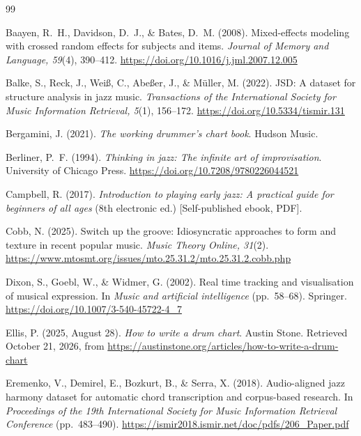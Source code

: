 \documentclass[10pt,twocolumn,a4paper]{article}
\begin{document}
\scriptsize
\begin{thebibliography}{99}
\setlength{\itemsep}{0.3ex}

Baayen, R.~H., Davidson, D.~J., \& Bates, D.~M. (2008). Mixed-effects modeling with
crossed random effects for subjects and items. \emph{Journal of Memory and Language,
59}(4), 390--412. \url{https://doi.org/10.1016/j.jml.2007.12.005}

Balke, S., Reck, J., Wei\ss, C., Abe\ss er, J., \& M\"uller, M. (2022). JSD: A
dataset for structure analysis in jazz music. \emph{Transactions of the International
Society for Music Information Retrieval, 5}(1), 156--172.
\url{https://doi.org/10.5334/tismir.131}

Bergamini, J. (2021). \emph{The working drummer's chart book}. Hudson Music.

Berliner, P.~F. (1994). \emph{Thinking in jazz: The infinite art of improvisation}.
University of Chicago Press. \url{https://doi.org/10.7208/9780226044521}

Campbell, R. (2017). \emph{Introduction to playing early jazz: A practical guide for
beginners of all ages} (8th electronic ed.) [Self-published ebook, PDF].

Cobb, N. (2025). Switch up the groove: Idiosyncratic approaches to form and texture in
recent popular music. \emph{Music Theory Online, 31}(2).
\url{https://www.mtosmt.org/issues/mto.25.31.2/mto.25.31.2.cobb.php}

Dixon, S., Goebl, W., \& Widmer, G. (2002). Real time tracking and visualisation of
musical expression. In \emph{Music and artificial intelligence} (pp.~58--68). Springer.
\url{https://doi.org/10.1007/3-540-45722-4_7}

Ellis, P. (2025, August 28). \emph{How to write a drum chart}. Austin Stone.
Retrieved October 21, 2026, from
\url{https://austinstone.org/articles/how-to-write-a-drum-chart}

Eremenko, V., Demirel, E., Bozkurt, B., \& Serra, X. (2018). Audio-aligned jazz
harmony dataset for automatic chord transcription and corpus-based research. In
\emph{Proceedings of the 19th International Society for Music Information Retrieval
Conference} (pp.~483--490).
\url{https://ismir2018.ismir.net/doc/pdfs/206_Paper.pdf}


\end{thebibliography}
\end{document}
